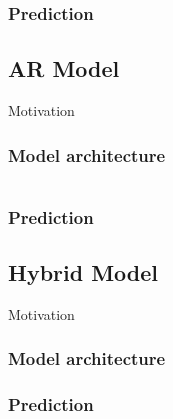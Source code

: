 \subsubsection{Prediction}

\subsection{AR Model}

Motivation

\subsubsection{Model architecture}


\begin{equation}
  \label{eq:ar_model}

\end{equation}


\subsubsection{Prediction}

\subsection{Hybrid Model}

Motivation

\subsubsection{Model architecture}



\subsubsection{Prediction}

